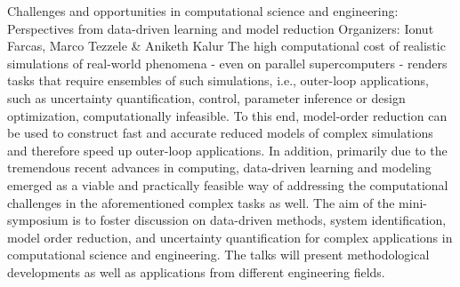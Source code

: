 \label{mini27}

\miniabs
{Challenges and opportunities in computational science and engineering: Perspectives from data-driven learning and model reduction}
{Organizers: Ionut Farcas, Marco Tezzele \& Aniketh Kalur}
{The high computational cost of realistic simulations of real-world phenomena - even on parallel supercomputers - renders tasks that require ensembles of such simulations, i.e., outer-loop applications, such as uncertainty quantification, control, parameter inference or design optimization, computationally infeasible. To this end, model-order reduction can be used to construct fast and accurate reduced models of complex simulations and therefore speed up outer-loop applications. In addition, primarily due to the tremendous recent advances in computing, data-driven learning and modeling emerged as a viable and practically feasible way of addressing the computational challenges in the aforementioned complex tasks as well. The aim of the mini-symposium is to foster discussion on data-driven methods, system identification, model order reduction, and uncertainty quantification for complex applications in computational science and engineering. The talks will present methodological developments as well as applications from different engineering fields.}

